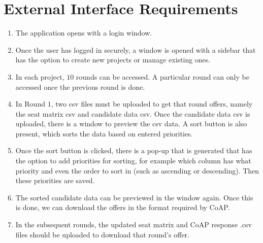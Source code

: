 \documentclass{report}
\begin{document}
\section{External Interface Requirements}\label{EIR}
\begin{enumerate}
    \item The application opens with a login window.
    \item Once the user has logged in securely, a window is opened with a sidebar that has the option to create new projects or manage existing ones.
    \item In each project, $10$ rounds can be accessed. A particular round can only be accessed once the previous round is done.
    \item In Round $1$, two csv files must be uploaded to get that round offers, namely the seat matrix csv and candidate data csv. Once the candidate data csv is uploaded, there is a window to preview the csv data. A sort button is also present, which sorts the data based on entered priorities.
    \item Once the sort button is clicked, there is a pop-up that is generated that has the option to add priorities for sorting, for example which column has what priority and even the order to sort in (such as ascending or descending). Then these priorities are saved.
    \item The sorted candidate data can be previewed in the window again. Once this is done, we can download the offers in the format required by CoAP.
    \item In the subsequent rounds, the updated seat matrix and CoAP response .csv files should be uploaded to download that round’s offer.
\end{enumerate}
\end{document}
